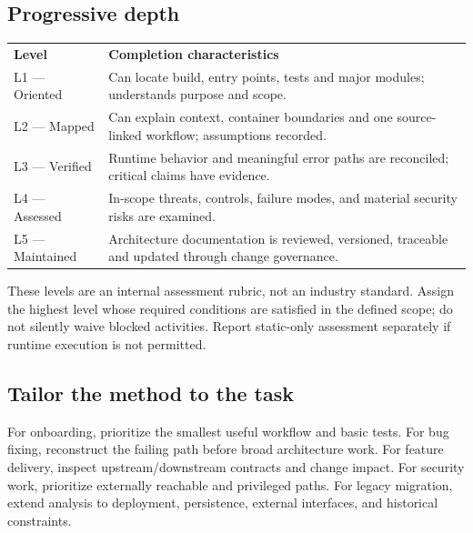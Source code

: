 \documentclass[11pt,letterpaper]{article}
\newcommand{\tablehead}[2]{\rowcolor{navy}\color{white}\textbf{#1}&\color{white}\textbf{#2}\\}
\begin{document}
\subsection{Progressive depth}

\noindent\begin{tabularx}{\linewidth}{@{}P{1.4in}Y@{}}
\tablehead{Level}{Completion characteristics}
L1 --- Oriented & Can locate build, entry points, tests and major modules; understands purpose and scope.\\
L2 --- Mapped & Can explain context, container boundaries and one source-linked workflow; assumptions recorded.\\
L3 --- Verified & Runtime behavior and meaningful error paths are reconciled; critical claims have evidence.\\
L4 --- Assessed & In-scope threats, controls, failure modes, and material security risks are examined.\\
L5 --- Maintained & Architecture documentation is reviewed, versioned, traceable and updated through change governance.\\
\bottomrule
\end{tabularx}
These levels are an internal assessment rubric, not an industry standard. Assign the highest level whose required conditions are satisfied in the defined scope; do not silently waive blocked activities. Report static-only assessment separately if runtime execution is not permitted.
\subsection{Tailor the method to the task}
For onboarding, prioritize the smallest useful workflow and basic tests. For bug fixing, reconstruct the failing path before broad architecture work. For feature delivery, inspect upstream/downstream contracts and change impact. For security work, prioritize externally reachable and privileged paths. For legacy migration, extend analysis to deployment, persistence, external interfaces, and historical constraints.
\clearpage
\appendix
\end{document}
